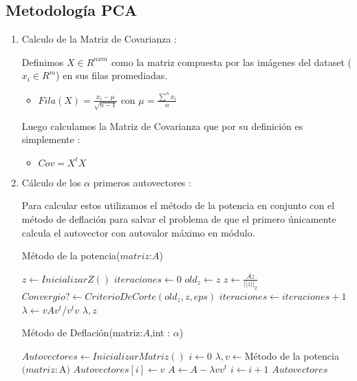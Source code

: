 \subsection{Metodología PCA}

 \begin{enumerate}
     \item Calculo de la Matriz de Covarianza :
     
Definimos $X \in R^{nxm}$ como la matriz compuesta por las imágenes del dataset ($x_i \in R^{m}$) en sus filas promediadas. 
\par

\begin{itemize}
	\item $Fila(X) =  \frac{x_i - \mu}{\sqrt{n-1}}$  con $\mu =\frac{\sum^{n} x_i}{n} $
\end{itemize}

Luego calculamos la Matriz de Covarianza que por su definición es simplemente :
\begin{itemize}
	\item $Cov=  X^{t}X $
\end{itemize}

\item Cálculo de los $\alpha$ primeros autovectores : 

Para calcular estos utilizamos el método de la potencia en conjunto con el método de deflación para salvar el problema de que el primero únicamente calcula el autovector con autovalor máximo en módulo.

\begin{algorithm}
\caption{Método de la potencia($matriz$:$A$)}
\begin{algorithmic}[1]
    \State $z \leftarrow InicializarZ()$
    \State $iteraciones \leftarrow 0$
        \State $old_z \leftarrow z$
        \State $z \leftarrow \frac{Az}{||z ||_2}$
        \State $Convergio? \leftarrow CriterioDeCorte(old_z,z,eps)$
        \State $iteraciones \leftarrow iteraciones +1$
    \EndWhile  
    \State $\lambda \leftarrow vAv^t/v^tv$
    \State
    \Return  $\lambda,z$
\end{algorithmic}
\end{algorithm}

\begin{algorithm}
\caption{Método de Deflación(matriz:$A$,int : $\alpha$)}
\begin{algorithmic}[1]
    \State $Autovectores \leftarrow InicializarMatriz()$
    \State $i \leftarrow 0$
        \State $\lambda,v \leftarrow $Método de la potencia$(matriz:$A$)$
        \State $Autovectores[i] \leftarrow v$
        \State $A \leftarrow A - \lambda vv^t$
        \State $i \leftarrow i +1$
    \EndWhile  
    \State
    \Return  $Autovectores$
\end{algorithmic}
\end{algorithm}


\end{enumerate}
